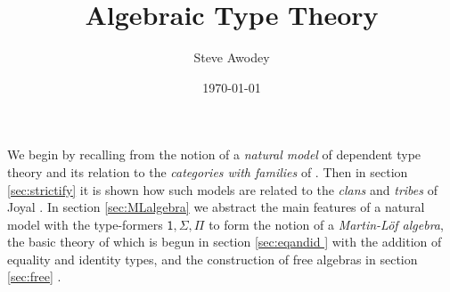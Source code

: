 \documentclass[12pt,reqno]{amsart}
\newcommand{\C}{\ensuremath{\mathbb{C}}}
\newcommand{\op}[1]{\ensuremath{{#1}^{\mathsf{op}}}}
\newcommand{\Set}{\ensuremath{\mathsf{Set}}}
\newcommand{\Cat}{\ensuremath{\mathsf{Cat}}}
\newcommand{\too}{\ensuremath{\longrightarrow}}
\theoremstyle{remark}
\theoremstyle{definition}
\begin{document}


\title{Algebraic Type Theory}
\author{Steve Awodey}
\date{\today}
\maketitle







We begin by recalling from \cite{awodey:NM} the notion of a \emph{natural model} of dependent type theory and its relation to the \emph{categories with families} of \cite{dybjer:CwF}.  Then in section \ref{sec:strictify} it is shown how such models are related to the \emph{clans} and \emph{tribes} of Joyal \cite{Joyal:clan}.  In section \ref{sec:MLalgebra} we abstract the main features of a natural model with the type-formers $\mathsf{1}, \Sigma, \Pi$ to form the notion of a \emph{Martin-L\"of algebra}, the basic theory of which is begun in section \ref{sec:eqandid } with the addition of equality and identity types, and the construction of free algebras in section \ref{sec:free} . 
\end{document}
